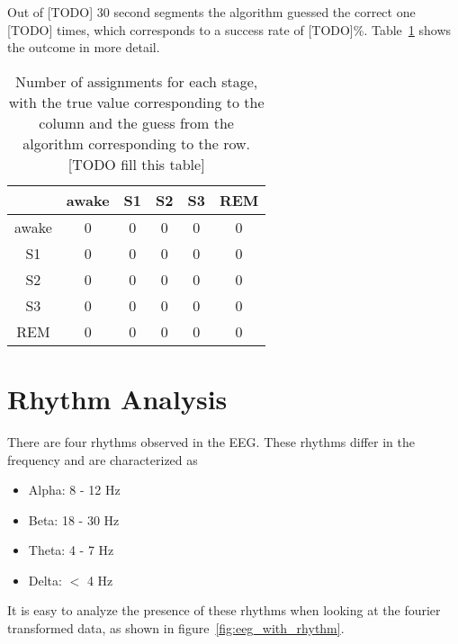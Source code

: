 Out of [TODO] 30 second segments the algorithm guessed the correct one [TODO] times, which corresponds to a success rate of [TODO]\%. Table~\ref{tab:error_validation} shows the outcome in more detail. 

\begin{table}
	\centering
	\begin{tabular}{c|ccccc}
		 & awake & S1 & S2 & S3 & REM \\
		\hline
		awake & 0 & 0 & 0 & 0 & 0 \\
		S1    & 0 & 0 & 0 & 0 & 0 \\
		S2    & 0 & 0 & 0 & 0 & 0 \\
		S3    & 0 & 0 & 0 & 0 & 0 \\
		REM   & 0 & 0 & 0 & 0 & 0 \\
	\end{tabular}
	\caption{Number of assignments for each stage, with the true value corresponding to the column and the guess from the algorithm corresponding to the row. [TODO fill this table]}
	\label{tab:error_validation}
\end{table}


\section{Rhythm Analysis}
There are four rhythms observed in the EEG\cite[chapter~11]{Ganong1997}. These rhythms differ in the frequency and are characterized as

\begin{itemize}
	\item Alpha: 8 - 12 Hz
	\item Beta: 18 - 30 Hz
	\item Theta: 4 - 7 Hz
	\item Delta: $<$ 4 Hz
\end{itemize}

It is easy to analyze the presence of these rhythms when looking at the fourier transformed data, as shown in figure~\ref{fig:eeg_with_rhythm}.

